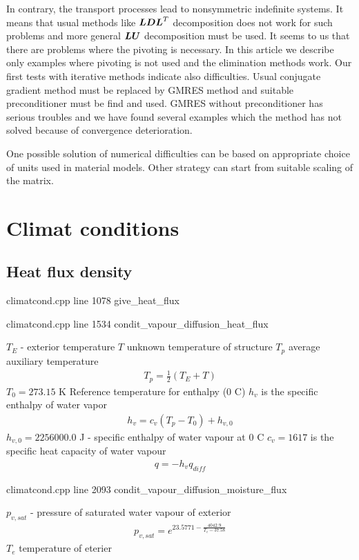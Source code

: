 In contrary, the transport processes lead to nonsymmetric indefinite systems. It means
that usual methods like $\mbox{\boldmath$LDL$}^T$ decomposition does not work for such problems and more
general $\mbox{\boldmath$LU$}$ decomposition must be used. It seems to us that there are problems where
the pivoting is necessary. In this article we describe only examples where pivoting is not
used and the elimination methods work. Our first tests with iterative methods indicate also
difficulties. Usual conjugate gradient method must be replaced by GMRES method and suitable
preconditioner must be find and used. GMRES without preconditioner has serious troubles and we
have found several examples which the method has not solved because of convergence deterioration.

One possible solution of numerical difficulties can be based on appropriate choice of units
used in material models. Other strategy can start from suitable scaling of the matrix.

\chapter{Climat conditions}

\section{Heat flux density}
climatcond.cpp line 1078
give\_heat\_flux 

climatcond.cpp line 1534
condit\_vapour\_diffusion\_heat\_flux

$T_E$ - exterior temperature
$T$ unknown temperature of structure
$T_p$ average auxiliary temperature
\begin{eqnarray}
T_p = \frac{1}{2}(T_E + T)
\end{eqnarray}
$T_0=273.15$ K Reference temperature for enthalpy (0 C)
$h_v$ is the specific enthalpy of water vapor
\begin{eqnarray}
h_v = c_v (T_p-T_0) + h_{v,0}
\end{eqnarray}
$h_{v,0}=2256000.0$ J - specific enthalpy of water vapour at 0 C
$c_v = 1617$ is the specific heat capacity of water vapour
\begin{eqnarray}
q = - h_v q_{diff}
\end{eqnarray}


climatcond.cpp line 2093
condit\_vapour\_diffusion\_moisture\_flux

$p_{v,sat}$ - pressure of saturated water vapour of exterior
\begin{eqnarray}
p_{v,sat} = e^{23.5771 - \frac{4042.9}{T_e - 37.58}}
\end{eqnarray}
$T_e$ temperature of eterier


